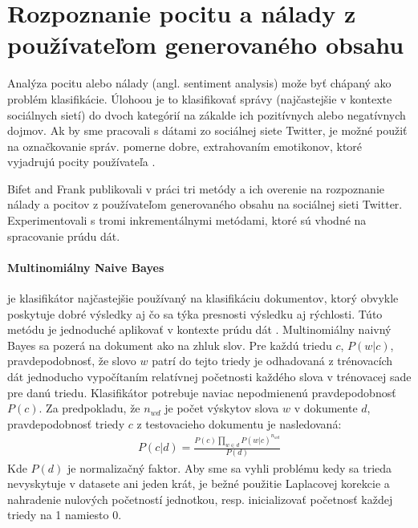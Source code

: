 \section{Rozpoznanie pocitu a nálady z používateľom generovaného obsahu}
Analýza pocitu alebo nálady (angl. sentiment analysis) može byť chápaný ako problém klasifikácie. Úlohoou je to klasifikovať správy (najčastejšie v kontexte sociálnych sietí) do dvoch kategórií na zákalde ich pozitívnych alebo negatívnych dojmov. Ak by sme pracovali s dátami zo sociálnej siete Twitter, je možné použiť na označkovanie správ. pomerne dobre, extrahovaním emotikonov, ktoré vyjadrujú pocity používateľa \citep{bifet2010sentiment}.  \par
Bifet and Frank publikovali v práci \citep{bifet2010sentiment} tri metódy a ich overenie na rozpoznanie nálady a pocitov z používateľom generovaného obsahu na sociálnej sieti Twitter. Experimentovali s tromi inkrementálnymi metódami, ktoré sú vhodné na spracovanie prúdu dát.

\paragraph{Multinomiálny Naive Bayes} je klasifikátor najčastejšie používaný na klasifikáciu dokumentov, ktorý obvykle poskytuje dobré výsledky aj čo sa týka presnosti výsledku aj rýchlosti. Túto metódu je jednoduché aplikovať v kontexte prúdu dát \citep{bifet2010sentiment}. Multinomiálny naivný Bayes sa pozerá na dokument ako na zhluk slov. Pre každú triedu $c$, $P(w|c)$, pravdepodobnosť, že slovo $w$ patrí do tejto triedy je odhadovaná z trénovacích dát jednoducho vypočítaním relatívnej početnosti každého slova v trénovacej sade pre danú triedu. Klasifikátor potrebuje naviac nepodmienenú pravdepodobnosť $P(c)$. Za predpokladu, že $\displaystyle n_{wd}$ je počet výskytov slova $w$ v dokumente $d$, pravdepodobnosť triedy $c$ z testovacieho dokumentu je nasledovaná: \newline
\begin{align*}
P(c|d) = \frac{P(c)\prod _{w \in d} P(w|c)^{n_{wd}}} {P(d)}
\end{align*}
Kde $P(d)$ je normalizačný faktor. Aby sme sa vyhli problému kedy sa trieda nevyskytuje v datasete ani jeden krát, je bežné použitie Laplacovej korekcie a nahradenie nulových početností jednotkou, resp. inicializovať početnosť každej triedy na 1 namiesto 0.

